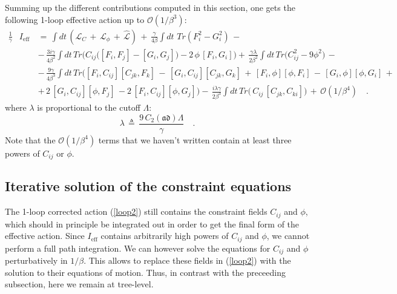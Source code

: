 \documentclass[a4paper,11pt]{article}
\begin{document}
Summing up the different contributions computed in this section, one gets the following 1-loop effective action 
up to $\mathcal{O}(1/\beta ^{3})$:
\begin{eqnarray}
\frac{1}{\gamma} &I_{\text{eff}}\,&=\,\int dt\,\left( \mathcal{L}_{C}\,+\,\mathcal{L}_{\phi }\,+
\,\widehat{\mathcal{L}}\right) \,+\,\frac{\gamma}{4\beta }\int dt\,
\,Tr\left(F_{i}^{2}-G_{i}^{2}\right)\,-  \nonumber \\
&&-\,\frac{3i\gamma}{4\beta ^{2}}\int dt\,Tr\bigg(C_{ij}\Big([F_{i},F_{j}]-[G_{i},G_{j}]\Big)-2\,\phi\,[F_{i},G_{i}]\bigg)
+\,\frac{\gamma\lambda}{2\beta^2}\int dt\,Tr\bigg(C_{ij}^{2}-9\phi ^{2}\bigg)\,-\nonumber\\
&&-\,\frac{9\gamma}{4\beta ^{3}}\int dt\,Tr\bigg([F_{i},C_{ij}][C_{jk},F_{k}]\,-\,[G_{i},C_{ij}][C_{jk},G_{k}]\,+\, 
[F_{i},\phi][\phi,F_{i}]\,-\,[G_{i},\phi][\phi,G_{i}]\,+\nonumber\\
&&+\,2\,[G_{i},C_{ij}][\phi,F_{j}]\,-2\,[F_i,C_{ij}][\phi,G_{j}]\bigg)-\,
\frac{i\lambda\gamma}{2\beta^3}\int dt\,Tr\bigg( \,C_{ij}\,[C_{jk},C_{ki}]\bigg) \,+\,\mathcal{O}(1/\beta ^{4})\quad .
\label{loop2}
\end{eqnarray}
where $\lambda$ is proportional to the cutoff $\Lambda$: 
\[
\lambda\,\triangleq \,\frac{9\,C_{2}(\mathfrak{ad})\Lambda }{\gamma }\quad .
\]
Note that the $\mathcal{O}(1/\beta ^{4})$ terms that we haven't written contain at least three powers of $C_{ij}$ or 
$\phi$. 

\subsection{Iterative solution of the constraint equations}

The 1-loop corrected action (\ref{loop2}) still contains the constraint fields 
$C_{ij}$ and $\phi$, which should in principle be integrated out in order to get
the final form of the effective action. Since $I_{\text{eff}}$ contains arbitrarily 
high powers of $C_{ij}$ and $\phi$, we cannot perform a full path integration. 
We can however solve the equations for $C_{ij}$ and $\phi$ perturbatively in $1/\beta $. 
This allows to replace these fields in (\ref{loop2}) with the solution to their equations of motion. 
Thus, in contrast with the preceeding subsection, here we remain at tree-level.
\end{document}
